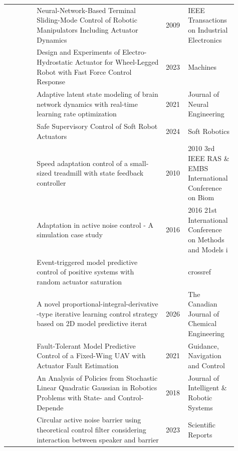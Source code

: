 \documentclass{article}
\begin{document}
\begin{center}
\begin{longtable}{p{0.12\linewidth}p{0.53\linewidth}p{0.08\linewidth}p{0.18\linewidth}}
\citep{pool86_46} & Neural-Network-Based Terminal Sliding-Mode Control of Robotic Manipulators Including Actuator Dynamics & 2009 & IEEE Transactions on Industrial Electronics\\
\citep{pool86_47} & Design and Experiments of Electro-Hydrostatic Actuator for Wheel-Legged Robot with Fast Force Control Response & 2023 & Machines\\
\citep{pool86_48} & Adaptive latent state modeling of brain network dynamics with real-time learning rate optimization & 2021 & Journal of Neural Engineering\\
\citep{pool86_49} & Safe Supervisory Control of Soft Robot Actuators & 2024 & Soft Robotics\\
\citep{pool86_50} & Speed adaptation control of a small-sized treadmill with state feedback controller & 2010 & 2010 3rd IEEE RAS \& EMBS International Conference on Biom\\
\citep{pool86_51} & Adaptation in active noise control - A simulation case study & 2016 & 2016 21st International Conference on Methods and Models i\\
\citep{pool86_52} & Event-triggered model predictive control of positive systems with random actuator saturation &  & crossref\\
\citep{pool86_53} & A novel proportional-integral-derivative -type iterative learning control strategy based on 2D model predictive iterat & 2026 & The Canadian Journal of Chemical Engineering\\
\citep{pool86_54} & Fault-Tolerant Model Predictive Control of a Fixed-Wing UAV with Actuator Fault Estimation & 2021 & Guidance, Navigation and Control\\
\citep{pool86_55} & An Analysis of Policies from Stochastic Linear Quadratic Gaussian in Robotics Problems with State- and Control-Depende & 2018 & Journal of Intelligent \& Robotic Systems\\
\citep{pool86_56} & Circular active noise barrier using theoretical control filter considering interaction between speaker and barrier & 2023 & Scientific Reports\\
\bottomrule
\end{longtable}
\normalsize
\end{center}
\end{document}
